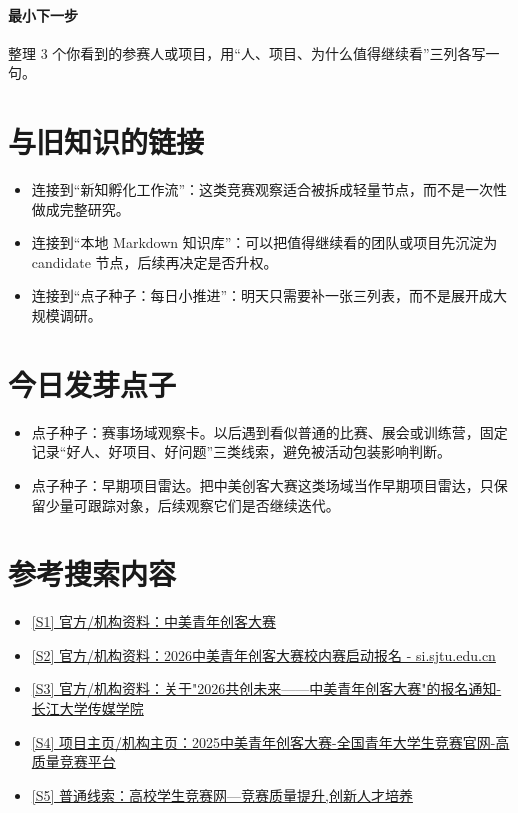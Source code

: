 \documentclass[UTF8,zihao=-4]{ctexart}
\begin{document}
\paragraph{最小下一步} 整理 3 个你看到的参赛人或项目，用“人、项目、为什么值得继续看”三列各写一句。
\section*{与旧知识的链接}
\begin{itemize}[leftmargin=2em]
\item 连接到“新知孵化工作流”：这类竞赛观察适合被拆成轻量节点，而不是一次性做成完整研究。
\item 连接到“本地 Markdown 知识库”：可以把值得继续看的团队或项目先沉淀为 candidate 节点，后续再决定是否升权。
\item 连接到“点子种子：每日小推进”：明天只需要补一张三列表，而不是展开成大规模调研。
\end{itemize}
\section*{今日发芽点子}
\begin{itemize}[leftmargin=2em]
\item 点子种子：赛事场域观察卡。以后遇到看似普通的比赛、展会或训练营，固定记录“好人、好项目、好问题”三类线索，避免被活动包装影响判断。
\item 点子种子：早期项目雷达。把中美创客大赛这类场域当作早期项目雷达，只保留少量可跟踪对象，后续观察它们是否继续迭代。
\end{itemize}
\section*{参考搜索内容}
\begin{itemize}[leftmargin=2em]
\item \href{https://chinaus-maker.cscse.edu.cn/}{[S1] 官方/机构资料：中美青年创客大赛}
\item \href{https://www.si.sjtu.edu.cn/content/news-detail?params=ba608706abad4c0fa4bf8bdf712a79c1&menuIds=3,26,28}{[S2] 官方/机构资料：2026中美青年创客大赛校内赛启动报名 - si.sjtu.edu.cn}
\item \href{https://yscm.yangtzeu.edu.cn/info/1087/11710.htm}{[S3] 官方/机构资料：关于"2026共创未来——中美青年创客大赛"的报名通知-长江大学传媒学院}
\item \href{http://www.zhjingsai.com/?m=home&c=View&a=index&aid=739}{[S4] 项目主页/机构主页：2025中美青年创客大赛-全国青年大学生竞赛官网-高质量竞赛平台}
\item \href{https://cp.moocollege.com/home/competition/details?competitionId=105634}{[S5] 普通线索：高校学生竞赛网—竞赛质量提升,创新人才培养}
\end{itemize}
\end{document}
